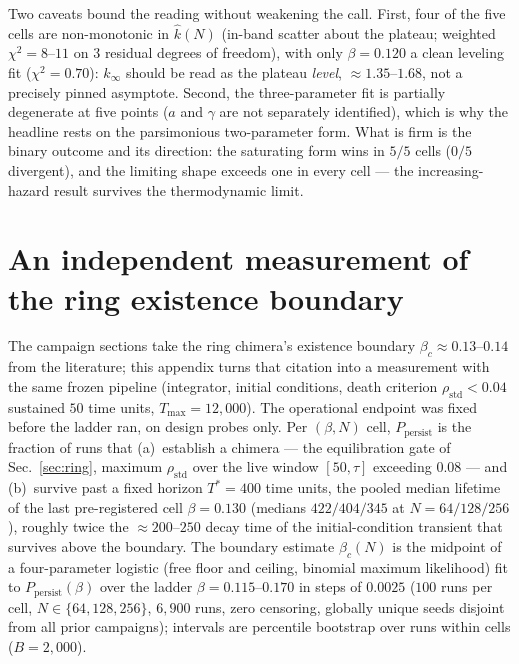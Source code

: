 \documentclass[pdflatex,sn-mathphys,Numbered]{sn-jnl}
\begin{document}
\begin{appendices}
Two caveats bound the reading without weakening the call. First, four of the
five cells are non-monotonic in $\hat k(N)$ (in-band scatter about the plateau;
weighted $\chi^2 = 8$--$11$ on $3$ residual degrees of freedom), with only
$\beta = 0.120$ a clean leveling fit ($\chi^2 = 0.70$): $k_\infty$ should be
read as the plateau \emph{level}, ${\approx}1.35$--$1.68$, not a precisely
pinned asymptote. Second, the three-parameter fit is partially degenerate at
five points ($a$ and $\gamma$ are not separately identified), which is why the
headline rests on the parsimonious two-parameter form. What is firm is the
binary outcome and its direction: the saturating form wins in $5/5$ cells
($0/5$ divergent), and the limiting shape exceeds one in every cell --- the
increasing-hazard result survives the thermodynamic limit.

\section{An independent measurement of the ring existence boundary}
\label{app:betac}

The campaign sections take the ring chimera's existence boundary
$\beta_c \approx 0.13$--$0.14$ from the literature; this appendix turns that
citation into a measurement with the same frozen pipeline (integrator, initial
conditions, death criterion $\rho_{\mathrm{std}} < 0.04$ sustained $50$ time
units, $T_{\max} = 12{,}000$). The operational endpoint was fixed before the
ladder ran, on design probes only. Per $(\beta, N)$ cell,
$P_{\mathrm{persist}}$ is the fraction of runs that (a)~establish a chimera ---
the equilibration gate of Sec.~\ref{sec:ring}, maximum $\rho_{\mathrm{std}}$
over the live window $[50, \tau]$ exceeding $0.08$ --- and (b)~survive past a
fixed horizon $T^{*} = 400$ time units, the pooled median lifetime of the last
pre-registered cell $\beta = 0.130$ (medians $422/404/345$ at
$N = 64/128/256$), roughly twice the ${\approx}200$--$250$ decay time of the
initial-condition transient that survives above the boundary. The boundary
estimate $\beta_c(N)$ is the midpoint of a four-parameter logistic (free floor
and ceiling, binomial maximum likelihood) fit to $P_{\mathrm{persist}}(\beta)$
over the ladder $\beta = 0.115$--$0.170$ in steps of $0.0025$ ($100$ runs per
cell, $N \in \{64, 128, 256\}$, $6{,}900$ runs, zero censoring, globally unique
seeds disjoint from all prior campaigns); intervals are percentile bootstrap
over runs within cells ($B = 2{,}000$).


\end{appendices}
\end{document}
